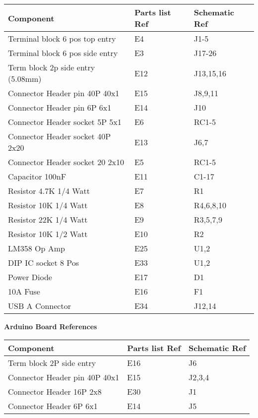 \documentclass{article}
\begin{document}
\begin{table}[H]
	\centering
	\begin{tabular}{| l | l | l | }
		\hline 
		\textbf{Component} & \textbf{Parts list Ref} & \textbf{Schematic Ref} \\ \hline
		Terminal block 6 pos top entry  & E4 & J1-5 \\ \hline
		Terminal block 6 pos side entry & E3 & J17-26 \\ \hline
		Term block 2p side entry (5.08mm) & E12 & J13,15,16 \\ \hline
		Connector Header pin 40P 40x1 & E15 & J8,9,11 \\ \hline
		Connector Header pin 6P 6x1 & E14 & J10 \\ \hline
		Connector Header socket 5P 5x1 & E6 & RC1-5 \\ \hline
		Connector Header socket 40P 2x20 & E13 & J6,7 \\ \hline
		Connector Header socket 20 2x10 & E5 & RC1-5 \\ \hline
		Capacitor 100nF & E11 & C1-17 \\ \hline
		Resistor 4.7K 1/4 Watt  & E7 & R1 \\ \hline
		Resistor 10K 1/4 Watt & E8 & R4,6,8,10 \\ \hline
		Resistor 22K 1/4 Watt & E9 & R3,5,7,9 \\ \hline
		Resistor 10K 1/2 Watt & E10 & R2 \\ \hline
		LM358 Op Amp & E25 & U1,2 \\ \hline
		DIP IC socket 8 Pos & E33 & U1,2 \\ \hline
		Power Diode & E17 & D1 \\ \hline
		10A Fuse & E16 & F1 \\ \hline
		USB A Connector & E34 & J12,14 \\ \hline

	\end{tabular}
\end{table}

\bigskip 
\begin{frame}{}
  \centering \Huge
  \textbf{Arduino Board References}
\end{frame}

\begin{table}[H]
	\centering
	\begin{tabular}{| l | l | l | }
		\hline 
		\textbf{Component} & \textbf{Parts list Ref} & \textbf{Schematic Ref} \\ \hline
		Term block 2P side entry & E16 & J6 \\ \hline
		Connector Header pin 40P 40x1 & E15 & J2,3,4 \\ \hline
		Connector Header 16P 2x8 & E30 & J1 \\ \hline
		Connector Header 6P 6x1 & E14 & J5 \\ \hline 

	\end{tabular}
\end{table}
\end{document}
